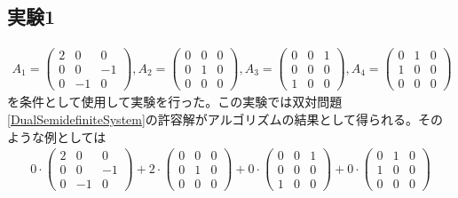 \subsection{実験1}
\begin{align*}
  A_1 = \left(
            \begin{array}{ccc}
              2 &  0 &  0 \\
              0 &  0 & -1 \\
              0 & -1 &  0
            \end{array}
          \right),
  A_2 = \left(
            \begin{array}{ccc}
              0 & 0 & 0 \\
              0 & 1 & 0 \\
              0 & 0 & 0
            \end{array}
          \right),
  A_3 = \left(
            \begin{array}{ccc}
              0 & 0 & 1 \\
              0 & 0 & 0 \\
              1 & 0 & 0
            \end{array}
          \right),
  A_4 = \left(
            \begin{array}{ccc}
              0 & 1 & 0 \\
              1 & 0 & 0 \\
              0 & 0 & 0
            \end{array}
          \right)
\end{align*}
を条件として使用して実験を行った。この実験では双対問題\ref{DualSemidefiniteSystem}の許容解がアルゴリズムの結果として得られる。そのような例としては
\begin{align*}
    0 \cdot \left(
              \begin{array}{ccc}
                2 &  0 &  0 \\
                0 &  0 & -1 \\
                0 & -1 &  0
              \end{array}
            \right)
  + 2 \cdot \left(
              \begin{array}{ccc}
                0 & 0 & 0 \\
                0 & 1 & 0 \\
                0 & 0 & 0
              \end{array}
            \right)
  + 0 \cdot \left(
              \begin{array}{ccc}
                0 & 0 & 1 \\
                0 & 0 & 0 \\
                1 & 0 & 0
              \end{array}
            \right)
  + 0 \cdot \left(
              \begin{array}{ccc}
                0 & 1 & 0 \\
                1 & 0 & 0 \\
                0 & 0 & 0
              \end{array}
            \right)
\end{align*}
